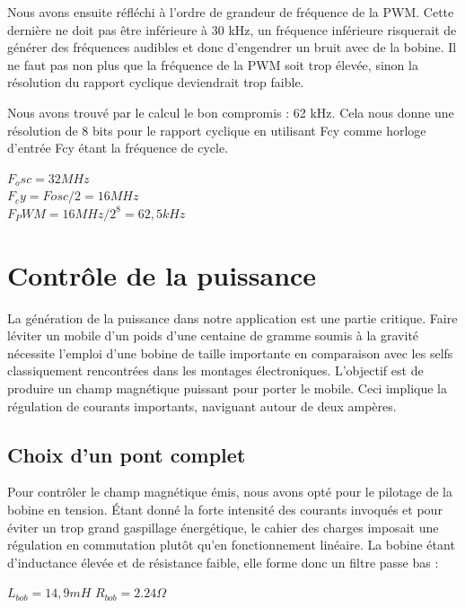 \documentclass[11pt, french]{article} %
\begin{document}
Nous avons ensuite réfléchi à l'ordre de grandeur de fréquence de la PWM. Cette dernière ne doit pas être inférieure à 30 kHz, un fréquence inférieure risquerait de générer des fréquences audibles et donc d'engendrer un bruit avec de la bobine. Il ne faut pas non plus que la fréquence de la PWM soit trop élevée, sinon la résolution du rapport cyclique deviendrait trop faible.

Nous avons trouvé par le calcul le bon compromis : 62 kHz. Cela nous donne une résolution de 8 bits pour le rapport cyclique en utilisant Fcy comme horloge d'entrée Fcy étant la fréquence de cycle.
\begin{center}
$F_osc = 32MHz$
\\$F_cy = Fosc/2 = 16MHz$
\\$F_PWM = 16MHz/2^8 = 62,5kHz$
\end{center}
\vspace{0.5cm}


\section{Contrôle de la puissance}

	La génération de la puissance dans notre application est une partie critique. Faire léviter un mobile d'un poids d'une centaine de gramme soumis à la gravité nécessite l'emploi d'une bobine de taille importante en comparaison avec les selfs classiquement rencontrées dans les montages électroniques. L'objectif est de produire un champ magnétique puissant pour porter le mobile. Ceci implique la régulation de courants importants, naviguant autour de deux ampères. 

\subsection{Choix d'un pont complet}
	Pour contrôler le champ magnétique émis, nous avons opté pour le pilotage de la bobine en tension. Étant donné la forte intensité des courants invoqués et pour éviter un trop grand gaspillage énergétique, le cahier des charges imposait une régulation en commutation plutôt qu'en fonctionnement linéaire. La bobine étant d'inductance élevée et de résistance faible, elle forme donc un filtre passe bas :

\medskip
$ L_{bob} = 14,9 mH $
$ R_{bob} = 2.24 \Omega $
\end{document}
